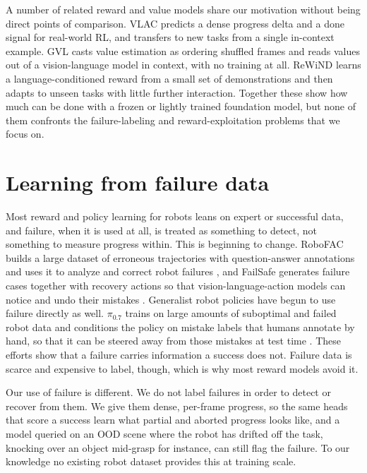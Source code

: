 A number of related reward and value models share our motivation without being direct points of comparison. VLAC \citep{zhai_vision-language-action-critic_2025} predicts a dense progress delta and a done signal for real-world RL, and transfers to new tasks from a single in-context example. GVL \citep{ma_vision_2025} casts value estimation as ordering shuffled frames and reads values out of a vision-language model in context, with no training at all. ReWiND \citep{zhang_rewind_2025} learns a language-conditioned reward from a small set of demonstrations and then adapts to unseen tasks with little further interaction. Together these show how much can be done with a frozen or lightly trained foundation model, but none of them confronts the failure-labeling and reward-exploitation problems that we focus on.

\section{Learning from failure data}

Most reward and policy learning for robots leans on expert or successful data, and failure, when it is used at all, is treated as something to detect, not something to measure progress within. This is beginning to change. RoboFAC builds a large dataset of erroneous trajectories with question-answer annotations and uses it to analyze and correct robot failures \citep{lu_robofac_2025}, and FailSafe generates failure cases together with recovery actions so that vision-language-action models can notice and undo their mistakes \citep{lin_failsafe_2025}. Generalist robot policies have begun to use failure directly as well. $\pi_{0.7}$ trains on large amounts of suboptimal and failed robot data and conditions the policy on mistake labels that humans annotate by hand, so that it can be steered away from those mistakes at test time \citep{pi07_2026}. These efforts show that a failure carries information a success does not. Failure data is scarce and expensive to label, though, which is why most reward models avoid it.

Our use of failure is different. We do not label failures in order to detect or recover from them. We give them dense, per-frame progress, so the same heads that score a success learn what partial and aborted progress looks like, and a model queried on an OOD scene where the robot has drifted off the task, knocking over an object mid-grasp for instance, can still flag the failure. To our knowledge no existing robot dataset provides this at training scale.

